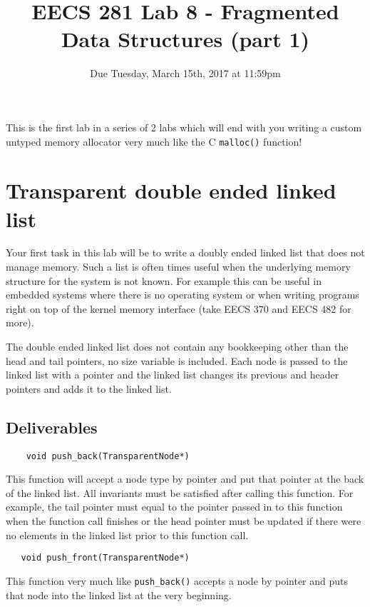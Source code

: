 \documentclass{article}
\begin{document}
\title{\textbf{EECS 281 Lab 8 - Fragmented Data Structures (part 1)}}
\author{Due Tuesday, March 15th, 2017 at 11:59pm}
\date{}
\maketitle
{}
{
   \pagestyle{empty}
}
\thispagestyle{firststyle}

This is the first lab in a series of 2 labs which will end with you writing a
custom untyped memory allocator very much like the C \texttt{malloc()} function!

\section{Transparent double ended linked list}
Your first task in this lab will be to write a doubly ended linked list that
does not manage memory.  Such a list is often times useful when the underlying
memory structure for the system is not known.  For example this can be useful
in embedded systems where there is no operating system or when writing
programs right on top of the kernel memory interface (take EECS 370 and EECS
482 for more).

The double ended linked list does not contain any bookkeeping other than the
head and tail pointers, no size variable is included.  Each node is passed to
the linked list with a pointer and the linked list changes its previous and
header pointers and adds it to the linked list.

\subsection{Deliverables}

\begin{lstlisting}
    void push_back(TransparentNode*)
\end{lstlisting}
This function will accept a node type by pointer and put that pointer at the
back of the linked list.  All invariants must be satisfied after calling this
function.  For example, the tail pointer must equal to the pointer passed in
to this function when the function call finishes or the head pointer must be
updated if there were no elements in the linked list prior to this function
call.

\begin{lstlisting}
   void push_front(TransparentNode*)
\end{lstlisting}
This function very much like \texttt{push\_back()} accepts a node by pointer
and puts that node into the linked list at the very beginning.
\end{document}
